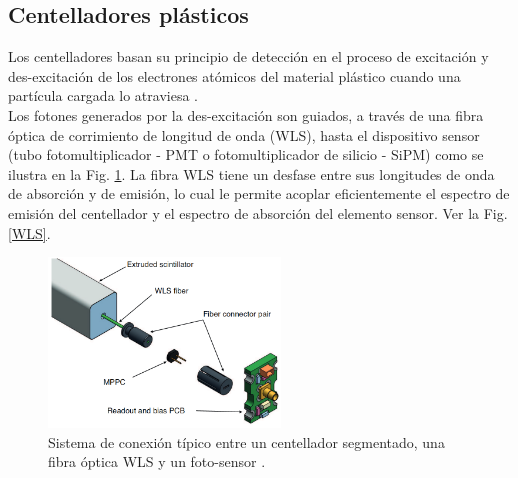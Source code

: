 \subsection{Centelladores plásticos}

Los centelladores basan su principio de detección en el proceso de excitación y des-excitación de los electrones atómicos del material plástico cuando una partícula cargada lo atraviesa \cite{Grupen2008, Kleinknecht2005}.\\

Los fotones generados por la des-excitación son guiados, a través de una fibra óptica de corrimiento de longitud de onda (WLS), hasta el dispositivo sensor (tubo fotomultiplicador - PMT o fotomultiplicador de silicio - SiPM) como se ilustra en la Fig. \ref{Scintillator}. La fibra WLS tiene un desfase entre sus longitudes de onda de absorción y de emisión, lo cual le permite acoplar eficientemente el espectro de emisión del centellador y el espectro de absorción del elemento sensor. Ver la Fig. \ref{WLS}.

\begin{figure}[h!]
\begin{center}
\includegraphics[width=0.55\textwidth]{Figures/Scintillator}
\caption[Sistema de conexión típico entre un centellador segmentado, una fibra óptica WLS y un foto-sensor]{Sistema de conexión típico entre un centellador segmentado, una fibra óptica WLS y un foto-sensor \cite{Str2014}.}
\label{Scintillator}
\end{center}
\end{figure}

